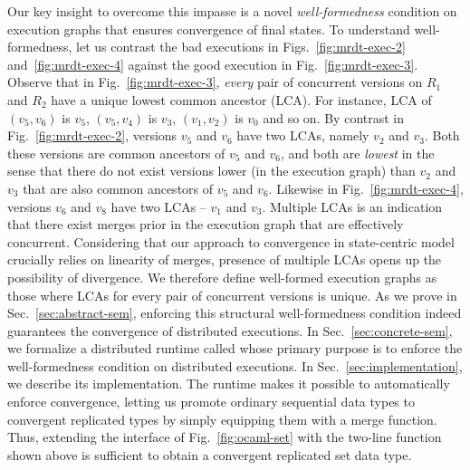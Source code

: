 Our key insight to overcome this impasse is a novel \emph{well-formedness}
condition on execution graphs that ensures convergence of final
states. To understand well-formedness, let us contrast the bad
executions in Figs.~\ref{fig:mrdt-exec-2} and~\ref{fig:mrdt-exec-4}
against the good execution in Fig.~\ref{fig:mrdt-exec-3}. Observe that
in Fig.~\ref{fig:mrdt-exec-3}, \emph{every} pair of concurrent
versions on $R_1$ and $R_2$ have a unique lowest common ancestor
(LCA). For instance, LCA of $(v_5,v_6)$ is $v_5$, $(v_5,v_4)$ is
$v_3$, $(v_1,v_2)$ is $v_0$ and so on. By contrast in
Fig.~\ref{fig:mrdt-exec-2}, versions $v_5$ and $v_6$ have two LCAs,
namely $v_2$ and $v_3$. Both these versions are common ancestors of
$v_5$ and $v_6$, and both are \emph{lowest} in the sense that there do
not exist versions lower (in the execution graph) than $v_2$ and $v_3$
that are also common ancestors of $v_5$ and $v_6$. Likewise in
Fig.~\ref{fig:mrdt-exec-4}, versions $v_6$ and $v_8$ have two LCAs --
$v_1$ and $v_3$. Multiple LCAs is an indication that there exist
merges prior in the execution graph that are effectively concurrent.
Considering that our approach to convergence in state-centric model
crucially relies on linearity of merges, presence of multiple LCAs
opens up the possibility of divergence. We therefore define
well-formed execution graphs as those where LCAs for every pair of
concurrent versions is unique. As we prove in
Sec.~\ref{sec:abstract-sem}, enforcing this structural
well-formedness condition indeed guarantees the convergence of
distributed executions. In Sec.~\ref{sec:concrete-sem}, we formalize a
distributed runtime called \quark whose primary purpose is to enforce
the well-formedness condition on distributed executions. In
Sec.~\ref{sec:implementation}, we describe its implementation. The
runtime makes it possible to automatically enforce convergence,
letting us promote ordinary sequential data types to convergent
replicated types by simply equipping them with a merge function.
Thus, extending the  interface of Fig.~\ref{fig:ocaml-set} with
the two-line  function shown above is sufficient to
obtain a convergent replicated set data type.
